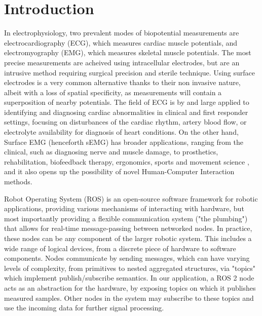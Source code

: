 \documentclass{thesis}
\begin{document}

\maketableofcontents

\section{Introduction}

In electrophysiology, two prevalent modes of biopotential measurements are electrocardiography (ECG), which measures cardiac muscle potentials, and electromyography (EMG), which measures skeletal muscle potentials. The most precise measurements are acheived using intracellular electrodes, but are an intrusive method requiring surgical precision and sterile technique. Using surface electrodes is a very common alternative thanks to their non invasive nature, albeit with a loss of spatial specificity, as measurements will contain a superposition of nearby potentials. The field of ECG is by and large applied to identifying and diagnosing cardiac abnormalities in clinical and first responder settings, focusing on disturbances of the cardiac rhythm, artery blood flow, or electrolyte availability for diagnosis of heart conditions. On the other hand, Surface EMG (henceforth sEMG) has broader applications, ranging from the clinical, such as diagnosing nerve and muscle damage, to prosthetics, rehabilitation, biofeedback therapy, ergonomics, sports and movement science \cite{Barbero2012}, and it also opens up the possibility of novel Human-Computer Interaction methods.

Robot Operating System (ROS) is an open-source software framework for robotic applications, providing various mechanisms of interacting with hardware, but most importantly providing a flexible communication system ("the plumbing") that allows for real-time message-passing between networked nodes.\cite{ros} In practice, these nodes can be any component of the larger robotic system. This includes a wide range of logical devices, from a discrete piece of hardware to software components. Nodes communicate by sending messages, which can have varying levels of complexity, from primitives to nested aggregated structures, via "topics" which implement publish/subscribe semantics. In our application, a ROS 2 node acts as an abstraction for the hardware, by exposing topics on which it publishes measured samples. Other nodes in the system may subscribe to these topics and use the incoming data for further signal processing.
\end{document}
